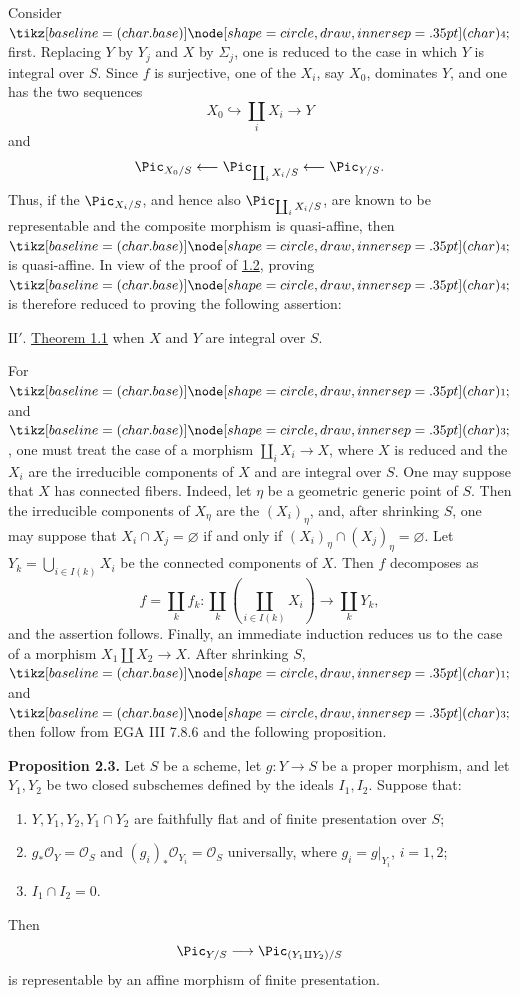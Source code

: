 Consider $\sgacircled{4}$ first. Replacing $Y$ by $Y_j$ and $X$ by
$\Sigma_j$, one is reduced to the case in which $Y$ is integral over $S$.
Since $f$ is surjective, one of the $X_i$, say $X_0$, dominates $Y$, and one
has the two sequences
\[
  X_0\hookrightarrow\coprod_iX_i\longrightarrow Y
\]
and
\[
  \Pic_{X_0/S}\longleftarrow\Pic_{\coprod_iX_i/S}
  \longleftarrow\Pic_{Y/S}.
\]
Thus, if the $\Pic_{X_i/S}$, and hence also
$\Pic_{\coprod_iX_i/S}$, are known to be representable and the composite
morphism is quasi-affine, then $\sgacircled{4}$ is quasi-affine. In view of
the proof of \hyperlink{sga6.e12.cor.1-2}{1.2}, proving $\sgacircled{4}$ is therefore reduced to proving
the following assertion:

\medskip
\noindent
$\mathrm{II}'$. \hyperlink{sga6.e12.thm.1-1}{Theorem 1.1} when $X$ and $Y$ are integral over $S$.
\medskip

For $\sgacircled{1}$ and $\sgacircled{3}$, one must treat the case of a
morphism $\coprod_iX_i\to X$, where $X$ is reduced and the $X_i$ are the
  irreducible components of $X$ and are integral over $S$. One may suppose that
  $X$ has connected fibers. Indeed, let $\eta$ be a geometric generic point of
  $S$.
Then the irreducible components of $X_\eta$ are the $(X_i)_\eta$, and, after
shrinking $S$, one may suppose that $X_i\cap X_j=\varnothing$ if and only if
$(X_i)_\eta\cap(X_j)_\eta=\varnothing$. Let
$Y_k=\bigcup_{i\in I(k)}X_i$ be the connected components of $X$. Then $f$
decomposes as
\[
  f=\coprod_k f_k:
  \coprod_k\left(\coprod_{i\in I(k)}X_i\right)
  \longrightarrow\coprod_kY_k,
\]
and the assertion follows. Finally, an immediate induction reduces us to the
case of a morphism $X_1\amalg X_2\to X$. After shrinking $S$,
$\sgacircled{1}$ and $\sgacircled{3}$ then follow from EGA III 7.8.6 and the
following proposition.

\textbf{Proposition 2.3.} Let $S$ be a scheme, let $g:Y\to S$ be a proper
morphism, and let $Y_1,Y_2$ be two closed subschemes defined by the ideals
$I_1,I_2$. Suppose that:
\begin{enumerate}[label=\alph*)]
\item $Y,Y_1,Y_2,Y_1\cap Y_2$ are faithfully flat and of finite presentation
  over $S$;
\item $g_*\mathcal O_Y=\mathcal O_S$ and
  $(g_i)_*\mathcal O_{Y_i}=\mathcal O_S$ universally, where
  $g_i=g|_{Y_i}$, $i=1,2$;
\item $I_1\cap I_2=0$.
\end{enumerate}
Then
\[
  \Pic_{Y/S}\longrightarrow\Pic_{(Y_1\amalg Y_2)/S}
\]
is representable by an affine morphism of finite presentation.

